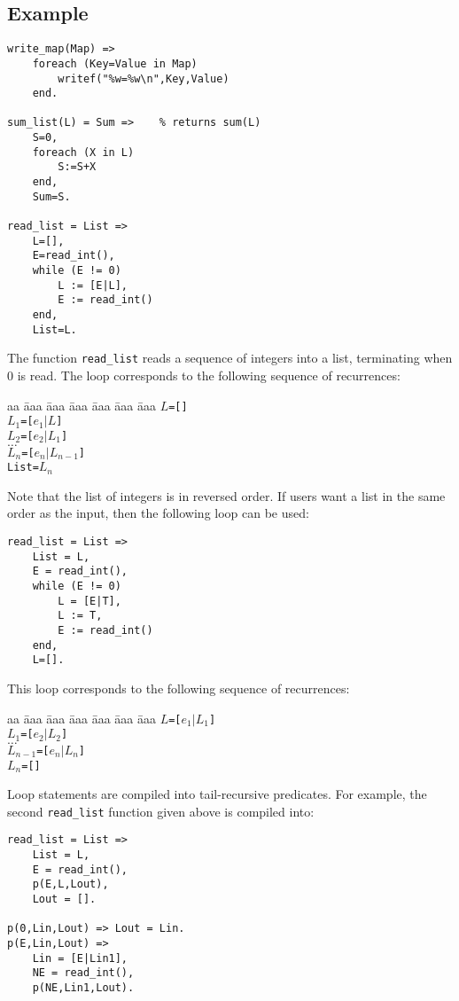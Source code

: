 \subsection*{Example}
\begin{verbatim}
write_map(Map) =>
    foreach (Key=Value in Map)
        writef("%w=%w\n",Key,Value)
    end.

sum_list(L) = Sum =>    % returns sum(L)
    S=0,
    foreach (X in L)
        S:=S+X
    end,
    Sum=S.

read_list = List =>
    L=[],
    E=read_int(),
    while (E != 0) 
        L := [E|L],
        E := read_int()
    end,
    List=L.
\end{verbatim}
The function \texttt{read\_list} reads a sequence of integers into a list, terminating when 0 is read. The loop corresponds to the following sequence of recurrences:
\begin{tabbing}
aa \= aaa \= aaa \= aaa \= aaa \= aaa \= aaa \kill
\> \texttt{$L$=[]} \\
\> \texttt{$L_1$=[$e_1$$|$$L$]} \\
\> \texttt{$L_2$=[$e_2$$|$$L_1$]} \\
\> $\ldots$ \\
\> \texttt{$L_n$=[$e_n$$|$$L_{n-1}$]} \\
\> \texttt{List=$L_n$}
\end{tabbing}
Note that the list of integers is in reversed order. If users want a list in the same order as the input, then the following loop can be used:
\begin{verbatim}
read_list = List =>
    List = L,
    E = read_int(),
    while (E != 0) 
        L = [E|T],
        L := T,
        E := read_int()
    end,
    L=[].
\end{verbatim}
This loop corresponds to the following sequence of recurrences:
\begin{tabbing}
aa \= aaa \= aaa \= aaa \= aaa \= aaa \= aaa \kill
\> \texttt{$L$=[$e_1$$|$$L_1$]} \\
\> \texttt{$L_1$=[$e_2$$|$$L_2$]} \\
\> $\ldots$ \\
\> \texttt{$L_{n-1}$=[$e_n$$|$$L_{n}$]} \\
\> \texttt{$L_n$=[]}
\end{tabbing}
Loop statements are compiled into tail-recursive predicates. For example, the second \texttt{read\_list} function given above is compiled into:
\begin{verbatim}
read_list = List =>
    List = L,
    E = read_int(),
    p(E,L,Lout),
    Lout = [].

p(0,Lin,Lout) => Lout = Lin.
p(E,Lin,Lout) => 
    Lin = [E|Lin1],
    NE = read_int(),
    p(NE,Lin1,Lout).
\end{verbatim}


